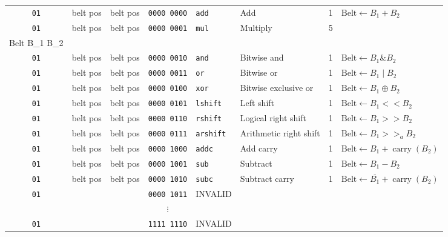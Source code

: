 \documentclass{article}
\begin{document}
\begin{landscape}
\begin{longtable}{c c c c l l r l}
		\texttt{01} & belt pos & belt pos & \texttt{0000 0000} & \texttt{add}     & Add                    & 1 & \(
			\textrm{Belt} \gets B_1 + B_2\) \\
		\texttt{01} & belt pos & belt pos & \texttt{0000 0001} & \texttt{mul}     & Multiply               & 5 & \(
			\begin{array}{l}
				\textrm{Belt} \gets \left(B_1 \cdot B_2\right) << 16, \\
				\textrm{Belt} \gets B_1 \cdot B_2
			\end{array}\) \\
		\texttt{01} & belt pos & belt pos & \texttt{0000 0010} & \texttt{and}     & Bitwise and            & 1 & \(
			\textrm{Belt} \gets B_1 \mathop{\&} B_2\) \\
		\texttt{01} & belt pos & belt pos & \texttt{0000 0011} & \texttt{or}      & Bitwise or             & 1 & \(
			\textrm{Belt} \gets B_1 \mathop{|} B_2\) \\
		\texttt{01} & belt pos & belt pos & \texttt{0000 0100} & \texttt{xor}     & Bitwise exclusive or   & 1 & \(
			\textrm{Belt} \gets B_1 \oplus B_2\) \\
		\texttt{01} & belt pos & belt pos & \texttt{0000 0101} & \texttt{lshift}  & Left shift             & 1 & \(
			\textrm{Belt} \gets B_1 << B_2\) \\
		\texttt{01} & belt pos & belt pos & \texttt{0000 0110} & \texttt{rshift}  & Logical right shift    & 1 & \(
			\textrm{Belt} \gets B_1 >> B_2\) \\
		\texttt{01} & belt pos & belt pos & \texttt{0000 0111} & \texttt{arshift} & Arithmetic right shift & 1 & \(
			\textrm{Belt} \gets B_1 >>_a B_2\) \\
		\texttt{01} & belt pos & belt pos & \texttt{0000 1000} & \texttt{addc}    & Add carry              & 1 & \(
			\textrm{Belt} \gets B_1 + \operatorname{carry}\left(B_2\right)\) \\
		\texttt{01} & belt pos & belt pos & \texttt{0000 1001} & \texttt{sub}     & Subtract               & 1 & \(
			\textrm{Belt} \gets B_1 - B_2\) \\
		\texttt{01} & belt pos & belt pos & \texttt{0000 1010} & \texttt{subc}    & Subtract carry         & 1 & \(
			\textrm{Belt} \gets \overline{B_1} + \operatorname{carry}\left(B_2\right)\) \\
		\texttt{01} & & & \texttt{0000 1011} & INVALID & & \\
								& & & \(\vdots\)         &         & & \\
		\texttt{01} & & & \texttt{1111 1110} & INVALID & & \\

\end{longtable}
\end{landscape}
\end{document}
